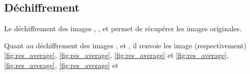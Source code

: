 \documentclass[a4paper]{article}
\begin{document}
        \subsection{Déchiffrement}

            Le déchiffrement des images , ,  et  permet de récupérer les images originales.

            Quant au déchiffrement des images ,  et , il renvoie les image (respectivement) \ref{fig:res_average}, \ref{fig:res_average}, \ref{fig:res_average} et \ref{fig:res_average}, \ref{fig:res_average}, \ref{fig:res_average} et
\end{document}

